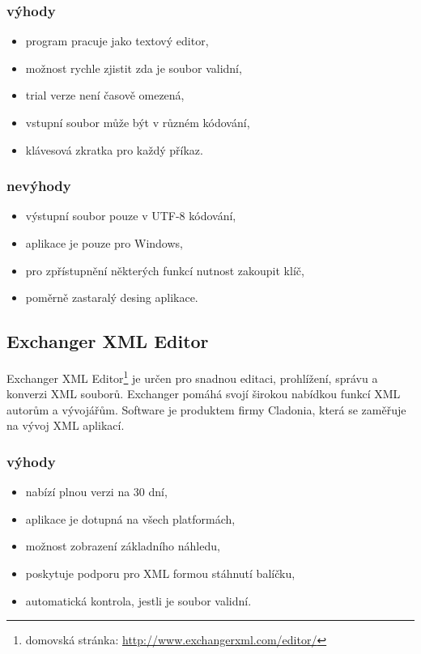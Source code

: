             \subsubsection{výhody}
                \begin{itemize}
                    \item program pracuje jako textový editor,
                    \item možnost rychle zjistit zda je soubor validní,
                    \item trial verze není časově omezená,
                    \item vstupní soubor může být v různém kódování,
                    \item klávesová zkratka pro každý příkaz.
                \end{itemize}
                
            \subsubsection{nevýhody}
                \begin{itemize}
                    \item výstupní soubor pouze v UTF-8 kódování,
                    \item aplikace je pouze pro Windows,
                    \item pro zpřístupnění některých funkcí nutnost zakoupit klíč,
                    \item poměrně zastaralý desing aplikace.
                \end{itemize}

        \subsection{Exchanger XML Editor}
            Exchanger XML Editor\footnote{domovská stránka: \url{http://www.exchangerxml.com/editor/}} je určen pro snadnou editaci, prohlížení, správu a konverzi XML souborů. Exchanger pomáhá svojí širokou nabídkou funkcí XML autorům a vývojářům.  Software je produktem firmy Cladonia, která se zaměřuje na vývoj XML aplikací. 
            
            \subsubsection{výhody}
                \begin{itemize}
                    \item nabízí plnou verzi na 30 dní,
                    \item aplikace je dotupná na všech platformách,
                    \item možnost zobrazení základního náhledu,
                    \item poskytuje podporu pro XML formou stáhnutí balíčku,
                    \item automatická kontrola, jestli je soubor validní.
                \end{itemize}
                
